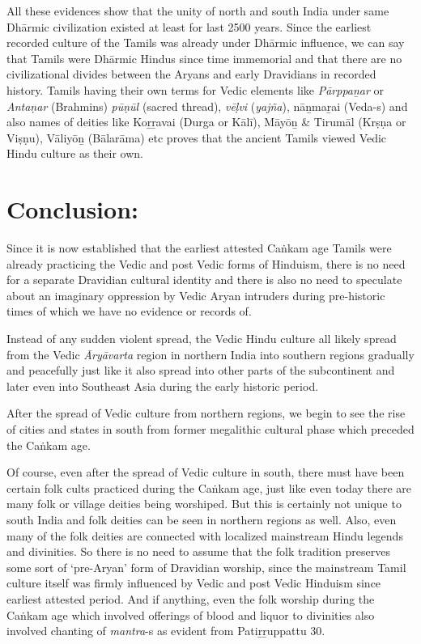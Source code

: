 All these evidences show that the unity of north and south India under same Dhārmic civilization existed at least for last 2500 years. Since the earliest recorded culture of the Tamils was already under Dhārmic influence, we can say that Tamils were Dhārmic Hindus since time immemorial and that there are no civilizational divides between the Aryans and early Dravidians in recorded history. Tamils having their own terms for Vedic elements like \textit{Pārppaṉar} or \textit{Antaṇar} (Brahmins) \textit{pūṇūl} (sacred thread), \textit{vēḷvi} (\textit{yajña}), nāṉmaṟai (Veda-s) and also names of deities like Koṟṟavai (Durga or Kālī), Māyōṉ \& Tirumāl (Krṣṇa or Viṣṇu), Vāliyōṉ (Bālarāma) etc proves that the ancient Tamils viewed Vedic Hindu culture as their own.


\section*{Conclusion:}

Since it is now established that the earliest attested Caṅkam age Tamils were already practicing the Vedic and post Vedic forms of Hinduism, there is no need for a separate Dravidian cultural identity and there is also no need to speculate about an imaginary oppression by Vedic Aryan intruders during pre-historic times of which we have no evidence or records of.

Instead of any sudden violent spread, the Vedic Hindu culture all likely spread from the Vedic \textit{Āryāvarta} region in northern India into southern regions gradually and peacefully just like it also spread into other parts of the subcontinent and later even into Southeast Asia during the early historic period.

After the spread of Vedic culture from northern regions, we begin to see the rise of cities and states in south from former megalithic cultural phase which preceded the Caṅkam age.

\newpage

Of course, even after the spread of Vedic culture in south, there must have been certain folk cults practiced during the Caṅkam age, just like even today there are many folk or village deities being worshiped. But this is certainly not unique to south India and folk deities can be seen in northern regions as well. Also, even many of the folk deities are connected with localized mainstream Hindu legends and divinities. So there is no need to assume that the folk tradition preserves some sort of ‘pre-Aryan’ form of Dravidian worship, since the mainstream Tamil culture itself was firmly influenced by Vedic and post Vedic Hinduism since earliest attested period. And if anything, even the folk worship during the Caṅkam age which involved offerings of blood and liquor to divinities also involved chanting of \textit{mantra}-s as evident from Patiṟṟuppattu 30.

